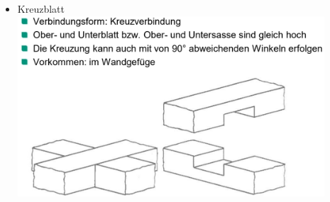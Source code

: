 \documentclass[fleqn,twoside]{article}
\begin{document}
\begin{minipage}{0.45\textwidth}
\begin{itemize}
                    \item Kreuzblatt\\
                        \includegraphics[width=0.9\textwidth]{Grafiken/Zimmermansmaessige Verbindungen/Verbindungsarten/Kreuzblatt.jpg}\\
            \end{itemize}
     \end{minipage}
    
\end{document}

